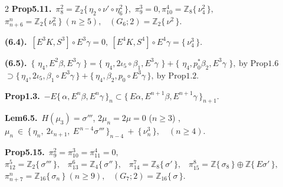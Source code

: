 \documentclass[10pt, leqno]{ltjsarticle}
\newcommand{\toda}[1]{\{\,#1\,\}}              %
\newcommand{\todai}[2][]{\{\,#2\,\}_{#1}}      %
\newcommand{\gen}[1]{\{\,#1\,\}}       %
\numberwithin{equation}{section}
\theoremstyle{plain}
\theoremstyle{definition}
\theoremstyle{remark}
\begin{document}
\begin{paracol}{2}
\noindent
\textbf{Prop5.11.}\
\(\pi^{2}_{8}=\mathbb Z_2\gen{\eta_{2}\circ\nu'\circ\eta_6^2},\)\quad 
\(\pi^{3}_{9}=0,\)\quad \(\pi^{4}_{10}=\mathbb Z_8\gen{\nu_{4}^2},\) \\
\(\pi^{n}_{n+6}=\mathbb Z_2\gen{\nu_n^2}\ (n\ge5),\) \
\((G_{6};2)=\mathbb Z_2\gen{\nu^2}.\)

\noindent
\textbf{(6.4).}\
\([E^{3}K, S^{3}] \circ E^{3}\gamma = 0, \
[E^{4}K, S^{4}] \circ E^{4}\gamma = \gen{\nu^{3}_{4}}.\)

\noindent
\textbf{(6.5).}\
\(\toda{\,\eta_{4},E^{2}\beta,E^{3}\gamma\,}
 = \toda{\,\eta_{4},2\iota_{5}\circ \beta_{1},E^{3}\gamma\,}
+\toda{\,\eta_{4},p_{0}^{\ast}\beta_{2},E^{3}\gamma\,},\
\text{by Prop1.6}\)\\
\(\supset \toda{\eta_4, 2\iota_5, \beta_1\circ E^3\gamma}
+ \toda{\eta_4, \beta_2, p_0\circ E^3\gamma},\
\text{by Prop1.2} .\)

\noindent
\textbf{Prop1.3.}\
\(-E\todai[n]{\alpha, E^n\beta, E^n\gamma}
\subset \todai[n+1]{E\alpha, E^{n+1}\beta, E^{n+1}\gamma}\).

\noindent
\textbf{Lem6.5.}\
\(H(\mu_{3})=\sigma'''\), \quad
\(2\mu_{n}=2\mu=0\) (\(n\ge3\)) , \\
\(
\mu_{n}\ \in\ \todai[n-4]{\eta_{n},\ 2\iota_{n+1},\ E^{\,n-4}\sigma'''}
\ +\ \gen{\nu^{3}_{n}},
\quad (n\ge4).
\)

\noindent
\textbf{Prop5.15.}\
\(\pi_9^2=\pi_{10}^3=\pi_{11}^4=0,\) \\
\(\pi^{5}_{12}=\mathbb Z_2\gen{\sigma'''},\) \
\(\pi^{6}_{13}=\mathbb Z_4\gen{\sigma''},\) \
\(\pi^{7}_{14}=\mathbb Z_8\gen{\sigma'},\) \
\(\pi^{8}_{15}=\mathbb Z\gen{\sigma_8}\oplus\mathbb Z\gen{E\sigma'},\) \\
\(\pi^{n}_{n+7}=\mathbb Z_{16}\gen{\sigma_n}\ (n\ge9),\) \
\((G_{7};2)=\mathbb Z_{16}\gen{\sigma}.\)






\end{paracol}
\end{document}
